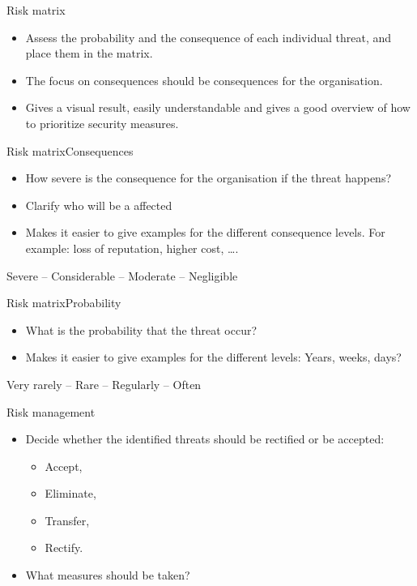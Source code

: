 \documentclass{beamer}
\begin{document}
\begin{frame}{Risk matrix}
  \begin{itemize}
    \item Assess the probability and the consequence of each individual threat,
      and place them in the matrix.
    \item The focus on consequences should be consequences for the organisation.
    \item Gives a visual result, easily understandable and gives a good overview
      of how to prioritize security measures.
  \end{itemize}
\end{frame}

\begin{frame}{Risk matrix}{Consequences}
  \begin{itemize}
    \item How severe is the consequence for the organisation if the threat
      happens?
    \item Clarify who will be a affected
    \item Makes it easier to give examples for the different consequence levels.
      For example: loss of reputation, higher cost, \dots.
  \end{itemize}
  \begin{center}
    Severe -- Considerable -- Moderate -- Negligible
  \end{center}
\end{frame}

\begin{frame}{Risk matrix}{Probability}
  \begin{itemize}
    \item What is the probability that the threat occur?
    \item Makes it easier to give examples for the different levels: Years,
      weeks, days?
  \end{itemize}
  \begin{center}
    Very rarely -- Rare -- Regularly -- Often
  \end{center}
\end{frame}

\begin{frame}{Risk management}
  \begin{itemize}
    \item Decide whether the identified threats should be rectified or be
      accepted:
      \begin{itemize}
        \item Accept,
        \item Eliminate,
        \item Transfer,
        \item Rectify.
      \end{itemize}
    \item What measures should be taken?
  \end{itemize}
\end{frame}
\end{document}
